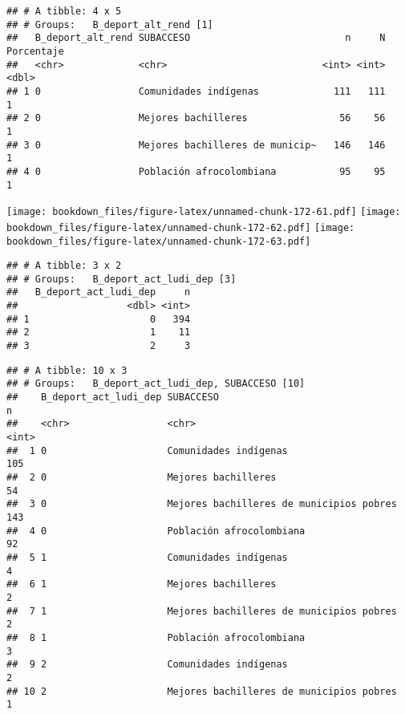 \documentclass[]{article}
\theoremstyle{definition}
\theoremstyle{definition}
\theoremstyle{definition}
\theoremstyle{remark}
\begin{document}
\begin{verbatim}
## # A tibble: 4 x 5
## # Groups:   B_deport_alt_rend [1]
##   B_deport_alt_rend SUBACCESO                           n     N Porcentaje
##   <chr>             <chr>                           <int> <int>      <dbl>
## 1 0                 Comunidades indígenas             111   111          1
## 2 0                 Mejores bachilleres                56    56          1
## 3 0                 Mejores bachilleres de municip~   146   146          1
## 4 0                 Población afrocolombiana           95    95          1
\end{verbatim}

\texttt{[image: bookdown\_files/figure-latex/unnamed-chunk-172-61.pdf]}
\texttt{[image: bookdown\_files/figure-latex/unnamed-chunk-172-62.pdf]}
\texttt{[image: bookdown\_files/figure-latex/unnamed-chunk-172-63.pdf]}

\begin{verbatim}
## # A tibble: 3 x 2
## # Groups:   B_deport_act_ludi_dep [3]
##   B_deport_act_ludi_dep     n
##                   <dbl> <int>
## 1                     0   394
## 2                     1    11
## 3                     2     3
\end{verbatim}

\begin{verbatim}
## # A tibble: 10 x 3
## # Groups:   B_deport_act_ludi_dep, SUBACCESO [10]
##    B_deport_act_ludi_dep SUBACCESO                                    n
##    <chr>                 <chr>                                    <int>
##  1 0                     Comunidades indígenas                      105
##  2 0                     Mejores bachilleres                         54
##  3 0                     Mejores bachilleres de municipios pobres   143
##  4 0                     Población afrocolombiana                    92
##  5 1                     Comunidades indígenas                        4
##  6 1                     Mejores bachilleres                          2
##  7 1                     Mejores bachilleres de municipios pobres     2
##  8 1                     Población afrocolombiana                     3
##  9 2                     Comunidades indígenas                        2
## 10 2                     Mejores bachilleres de municipios pobres     1
\end{verbatim}
\end{document}
